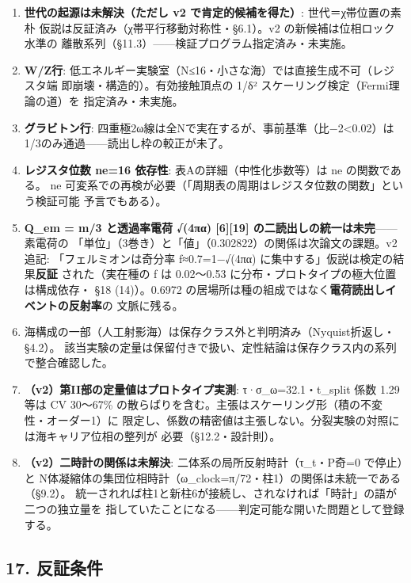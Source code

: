 \documentclass[
]{ltjarticle}
\providecommand{\tightlist}{%
  \setlength{\itemsep}{0pt}\setlength{\parskip}{0pt}}
\begin{document}
\begin{enumerate}
\def\labelenumi{\arabic{enumi}.}
\tightlist
\item
  \textbf{世代の起源は未解決（ただし v2 で肯定的候補を得た）}:
  世代＝χ帯位置の素朴 仮説は反証済み（χ帯平行移動対称性・§6.1）。v2
  の新候補は位相ロック水準の
  離散系列（§11.3）------検証プログラム指定済み・未実施。
\item
  \textbf{W/Z行}:
  低エネルギー実験室（N≤16・小さな海）では直接生成不可（レジスタ端
  即崩壊・構造的）。有効接触頂点の 1/δ²
  スケーリング検定（Fermi理論の道）を 指定済み・未実施。
\item
  \textbf{グラビトン行}:
  四重極2ω線は全Nで実在するが、事前基準（\textbar 比−2\textbar\textless0.02）は
  1/3のみ通過------読出し枠の較正が未了。
\item
  \textbf{レジスタ位数 ne=16 依存性}: 表Aの詳細（中性化歩数等）は ne
  の関数である。 ne
  可変系での再検が必要（「周期表の周期はレジスタ位数の関数」という検証可能
  予言でもある）。
\item
  \textbf{Q\_em = m/3 と透過率電荷 √(4πα) {[}6{]}{[}19{]}
  の二読出しの統一は未完}------素電荷の
  「単位」（3巻き）と「値」（0.302822）の関係は次論文の課題。v2 追記:
  「フェルミオンは奇分率 f≈0.7=1−√(4πα)
  に集中する」仮説は検定の結果\textbf{反証} された（実在種の f は
  0.02〜0.53 に分布・プロトタイプの極大位置は構成依存・ §18
  (14)）。0.6972
  の居場所は種の組成ではなく\textbf{電荷読出しイベントの反射率}の
  文脈に残る。
\item
  海構成の一部（人工射影海）は保存クラス外と判明済み（Nyquist折返し・§4.2）。
  該当実験の定量は保留付きで扱い、定性結論は保存クラス内の系列で整合確認した。
\item
  \textbf{（v2）第II部の定量値はプロトタイプ実測}: τ·σ\_ω=32.1・t\_split
  係数 1.29 等は CV 30〜67\%
  の散らばりを含む。主張はスケーリング形（積の不変性・オーダー1）に
  限定し、係数の精密値は主張しない。分裂実験の対照には海キャリア位相の整列が
  必要（§12.2・設計則）。
\item
  \textbf{（v2）二時計の関係は未解決}: 二体系の局所反射時計（τ\_t・P奇=0
  で停止）と
  N体凝縮体の集団位相時計（ω\_clock=π/72・柱1）の関係は未統一である（§9.2）。
  統一されれば柱1と新柱6が接続し、されなければ「時計」の語が二つの独立量を
  指していたことになる------判定可能な開いた問題として登録する。
\end{enumerate}

\subsection{17. 反証条件}\label{ux53cdux8a3cux6761ux4ef6}
\end{document}
